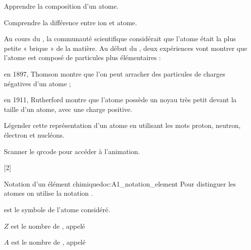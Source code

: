 \teteSndAtom



\begin{objectifs}
  \item Apprendre la composition d'un atome.
  \item Comprendre la différence entre ion et atome.
\end{objectifs}

\begin{contexte}
  Au cours du , la communauté scientifique considérait que l'atome était la plus petite « brique  » de la matière.
  Au début du , deux expériences vont montrer que l'atome est composé de particules plus élémentaires :
  \begin{listePoints}
    \item en 1897, Thomson montre que l'on peut arracher des particules de charges négatives d'un atome ;
    \item en 1911, Rutherford montre que l'atome possède un noyau très petit devant la taille d'un atome, avec une charge positive.
  \end{listePoints}
  
\end{contexte}



\numeroQuestion
Légender cette représentation d'un atome en utilisant les mots proton, neutron, électron et nucléons.

\begin{center}
\end{center}


\mesure Scanner le qrcode pour accéder à l'animation.

[2]

\begin{doc}{Notation d'un élément chimique}{doc:A1_notation_element}
  Pour distinguer les atomes on utilise la notation .
  \begin{importants}
    \begin{listePoints}
      \item {} est le symbole de l'atome considéré.
      \item $Z$ est le nombre de , appelé 
      \item $A$ est le nombre de , appelé 
    \end{listePoints}
  \end{importants}
\end{doc}

